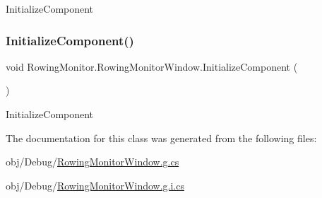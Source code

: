 Initialize\+Component 

\mbox{\label{class_rowing_monitor_1_1_rowing_monitor_window_ace5d64ad5ace3448f5390d3bb57ddc2e}} 
\subsubsection{\texorpdfstring{Initialize\+Component()}{InitializeComponent()}\hspace{0.1cm}{\footnotesize\ttfamily [4/4]}}
{\footnotesize\ttfamily void Rowing\+Monitor.\+Rowing\+Monitor\+Window.\+Initialize\+Component (\begin{DoxyParamCaption}{ }\end{DoxyParamCaption})}



Initialize\+Component 



The documentation for this class was generated from the following files\+:\begin{DoxyCompactItemize}
\item 
obj/\+Debug/\hyperlink{_debug_2_rowing_monitor_window_8g_8cs}{Rowing\+Monitor\+Window.\+g.\+cs}\item 
obj/\+Debug/\hyperlink{_debug_2_rowing_monitor_window_8g_8i_8cs}{Rowing\+Monitor\+Window.\+g.\+i.\+cs}\end{DoxyCompactItemize}
